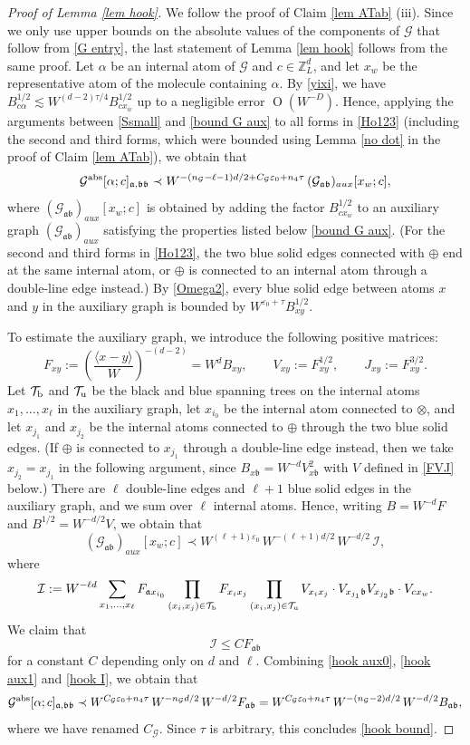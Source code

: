 \documentclass{article}
\newcommand{\1}{\mathds{1}}
\numberwithin{equation}{section}
\newcommand{\al}{\alpha}
\newcommand{\be}{\begin{equation}}
\newcommand{\ee}{\end{equation}}
\newcommand{\e}{{\varepsilon}}
\newcommand{\fa}{{\mathfrak a}}
\newcommand{\fb}{{\mathfrak b}}
\renewcommand{\cal}{\mathcal}
\renewcommand{\leq}{\leqslant}
\renewcommand{\le}{\leq}
\newcommand{\Z}{\mathbb{Z}}
\DeclareMathOperator{\OO}{O}
\theoremstyle{plain} %
\theoremstyle{remark}
\begin{document}
\begin{proof}[Proof of Lemma \ref{lem hook}]
We follow the proof of Claim \ref{lem ATab} (iii). Since we only use upper bounds on the absolute values of the components of $\cal G$ that follow from \eqref{G entry}, the last statement of Lemma \ref{lem hook} follows from the same proof. Let $\al$ be an internal atom of $\cal G$ and $c\in\Z_L^d$, and let $x_w$ be the representative atom of the molecule containing $\al$. By \eqref{yixi}, we have $B^{1/2}_{c\al}\lesssim W^{(d-2)\tau/4}B^{1/2}_{cx_w}$ up to a negligible error $\OO(W^{-D})$. Hence, applying the arguments between \eqref{Ssmall} and \eqref{bound G aux} to all forms in \eqref{Ho123} (including the second and third forms, which were bounded using Lemma \ref{no dot} in the proof of Claim \ref{lem ATab}), we obtain that
\be\label{hook aux0}
\cal G^{\rm abs}[\al;c]_{\fa,\fb\fb}\prec W^{-(n_{\cal G}-\ell-1)d/2+C_{\cal G}\e_0+n_4\tau}\, (\cal G_{\fa\fb})_{aux}[x_w;c],
\ee
where $(\cal G_{\fa\fb})_{aux}[x_w;c]$ is obtained by adding the factor $B^{1/2}_{cx_w}$ to an auxiliary graph $(\cal G_{\fa\fb})_{aux}$ satisfying the properties listed below \eqref{bound G aux}. (For the second and third forms in \eqref{Ho123}, the two blue solid edges connected with $\oplus$ end at the same internal atom, or $\oplus$ is connected to an internal atom through a double-line edge instead.) By \eqref{Omega2}, every blue solid edge between atoms $x$ and $y$ in the auxiliary graph is bounded by $W^{\e_0+\tau}B_{xy}^{1/2}$.

To estimate the auxiliary graph, we introduce the following positive matrices:
\be\label{FVJ}
F_{xy}:=\left(\frac{\langle x-y\rangle}{W}\right)^{-(d-2)}=W^d B_{xy},\qquad V_{xy}:=F_{xy}^{1/2},\qquad J_{xy}:=F_{xy}^{3/2}.
\ee
Let $\cal T_{\rm b}$ and $\cal T_{\rm u}$ be the black and blue spanning trees on the internal atoms $x_1,\ldots, x_\ell$ in the auxiliary graph, let $x_{i_0}$ be the internal atom connected to $\otimes$, and let $x_{j_1}$ and $x_{j_2}$ be the internal atoms connected to $\oplus$ through the two blue solid edges. (If $\oplus$ is connected to $x_{j_1}$ through a double-line edge instead, then we take $x_{j_2}=x_{j_1}$ in the following argument, since $B_{x\fb}=W^{-d}V_{x\fb}^2$ with $V$ defined in \eqref{FVJ} below.) There are $\ell$ double-line edges and $\ell+1$ blue solid edges in the auxiliary graph, and we sum over $\ell$ internal atoms. Hence, writing $B=W^{-d}F$ and $B^{1/2}=W^{-d/2}V$, we obtain that
\be\label{hook aux1}
(\cal G_{\fa\fb})_{aux}[x_w;c]\prec W^{(\ell+1)\e_0}\,W^{-(\ell+1)d/2}\,W^{-d/2}\,\cal I,
\ee
where
$$\cal I:=W^{-\ell d}\sum_{x_1,\ldots,x_\ell}F_{\fa x_{i_0}}\prod_{(x_i,x_j)\in \cal T_{\rm b}}F_{x_ix_j}\prod_{(x_i,x_j)\in \cal T_{\rm u}}V_{x_ix_j}\cdot V_{x_{j_1}\fb}V_{x_{j_2}\fb}\cdot V_{cx_w}.$$
We claim that
\be\label{hook I}
\cal I\le C F_{\fa\fb}
\ee
for a constant $C$ depending only on $d$ and $\ell$. Combining \eqref{hook aux0}, \eqref{hook aux1} and \eqref{hook I}, we obtain that
$$\cal G^{\rm abs}[\al;c]_{\fa,\fb\fb}\prec W^{C_{\cal G}\e_0+n_4\tau}\,W^{-n_{\cal G}d/2}\,W^{-d/2}F_{\fa\fb}=W^{C_{\cal G}\e_0+n_4\tau}\,W^{-(n_{\cal G}-2)d/2}\,W^{-d/2}B_{\fa\fb},$$
where we have renamed $C_{\cal G}$. Since $\tau$ is arbitrary, this concludes \eqref{hook bound}.


\end{proof}
\end{document}
